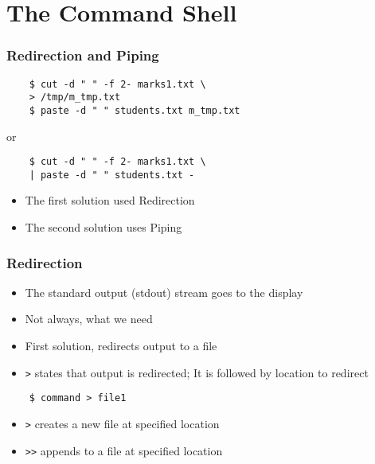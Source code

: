 \documentclass[12pt,compress]{beamer}
\begin{document}
\section{The Command Shell}

\begin{frame}[fragile]
  \frametitle{Redirection and Piping}
  \begin{lstlisting}
    $ cut -d " " -f 2- marks1.txt \
    > /tmp/m_tmp.txt
    $ paste -d " " students.txt m_tmp.txt
  \end{lstlisting} %

  or

  \begin{lstlisting}
    $ cut -d " " -f 2- marks1.txt \
    | paste -d " " students.txt -
  \end{lstlisting} %

  \begin{itemize}
  \item The first solution used Redirection
  \item The second solution uses Piping
  \end{itemize}
\end{frame}

\begin{frame}[fragile]
  \frametitle{Redirection} 

  \begin{itemize}
  \item The standard output (stdout) stream goes to the display
  \item Not always, what we need
  \item First solution, redirects output to a file
  \item \texttt{>} states that output is redirected; It is
    followed by location to redirect
  \end{itemize}
  \begin{lstlisting}
    $ command > file1
  \end{lstlisting} %
  \begin{itemize}
  \item \texttt{>} creates a new file at specified location
  \item \texttt{>>} appends to a file at specified location
  \end{itemize}
\end{frame}
\end{document}
